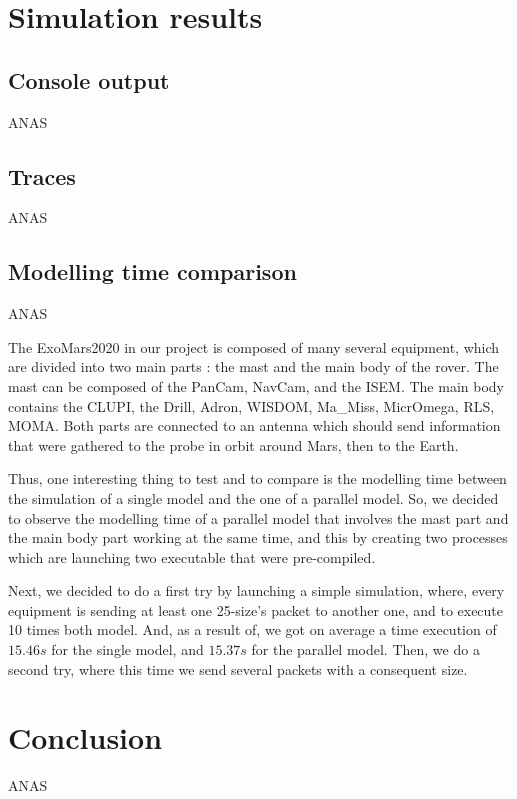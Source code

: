 \documentclass[12pt,a4paper]{article}
\begin{document}
\pagebreak

\section{Simulation results}

\subsection{Console output}

ANAS

\subsection{Traces}

ANAS

\subsection{Modelling time comparison}

ANAS

The ExoMars2020 in our project is composed of many several equipment, which are divided into two main parts : the mast and the main body of the rover. The mast can be composed of the PanCam, NavCam, and the ISEM. The main body contains the CLUPI, the Drill, Adron, WISDOM, Ma\_Miss, MicrOmega, RLS, MOMA. Both parts are connected to an antenna which should send information that were gathered to the probe in orbit around Mars, then to the Earth.\smallbreak

Thus, one interesting thing to test and to compare is the modelling time between the simulation of a single model and the one of a parallel model. So, we decided to observe the modelling time of a parallel model that involves the mast part and the main body part working at the same time, and this by creating two processes which are launching two executable that were pre-compiled.\smallbreak

Next, we decided to do a first try by launching a simple simulation, where, every equipment is sending at least one 25-size's packet to another one, and to execute 10 times both model. And, as a result of, we got on average a time execution of $15.46 s$ for the single model, and $15.37 s$ for the parallel model. Then, we do a second try, where this time we send several packets with a consequent size.\smallbreak

\pagebreak

\section{Conclusion}

ANAS

\pagebreak
\nocite{*}


\end{document}
